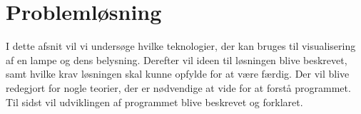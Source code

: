 \section{Problemløsning}
I dette afsnit vil vi undersøge hvilke teknologier, der kan bruges til visualisering af en lampe og dens belysning. Derefter vil ideen til løsningen blive beskrevet, samt hvilke krav løsningen skal kunne opfylde for at være færdig. Der vil blive redegjort for nogle teorier, der er nødvendige at vide for at forstå programmet. Til sidst vil udviklingen af programmet blive beskrevet og forklaret. 






\clearpage